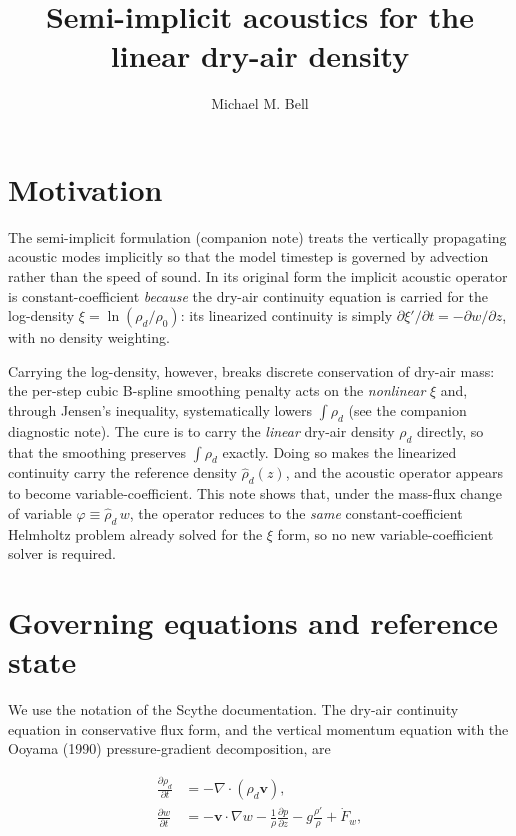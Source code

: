 \documentclass[11pt, oneside]{article}   	%
\title{Semi-implicit acoustics for the linear dry-air density}
\author{Michael M. Bell}
\begin{document}
\maketitle

\section{Motivation}

The semi-implicit formulation (companion note) treats the vertically propagating
acoustic modes implicitly so that the model timestep is governed by advection rather
than the speed of sound. In its original form the implicit acoustic operator is
constant-coefficient \emph{because} the dry-air continuity equation is carried for the
log-density $\xi = \ln(\rho_d/\rho_0)$: its linearized continuity is simply
$\partial \xi'/\partial t = -\partial w/\partial z$, with no density weighting.

Carrying the log-density, however, breaks discrete conservation of dry-air mass: the
per-step cubic B-spline smoothing penalty acts on the \emph{nonlinear} $\xi$ and,
through Jensen's inequality, systematically lowers $\int \rho_d$ (see the companion
diagnostic note). The cure is to carry the \emph{linear} dry-air density $\rho_d$
directly, so that the smoothing preserves $\int \rho_d$ exactly. Doing so makes the
linearized continuity carry the reference density $\hat{\rho}_d(z)$, and the acoustic
operator appears to become variable-coefficient. This note shows that, under the
mass-flux change of variable $\varphi \equiv \hat{\rho}_d\, w$, the operator reduces to
the \emph{same} constant-coefficient Helmholtz problem already solved for the $\xi$
form, so no new variable-coefficient solver is required.

\section{Governing equations and reference state}

We use the notation of the Scythe documentation. The dry-air continuity equation in
conservative flux form, and the vertical momentum equation with the Ooyama (1990)
pressure-gradient decomposition, are

\begin{align}
\frac{\partial \rho_d}{\partial t} &= -\nabla \cdot \left( \rho_d \mathbf{v} \right) , \\
\frac{\partial w}{\partial t} &= -\mathbf{v}\cdot\nabla w
   - \frac{1}{\rho}\frac{\partial p}{\partial z} - g\frac{\rho'}{\rho} + \dot{F}_w ,
\end{align}
\end{document}
